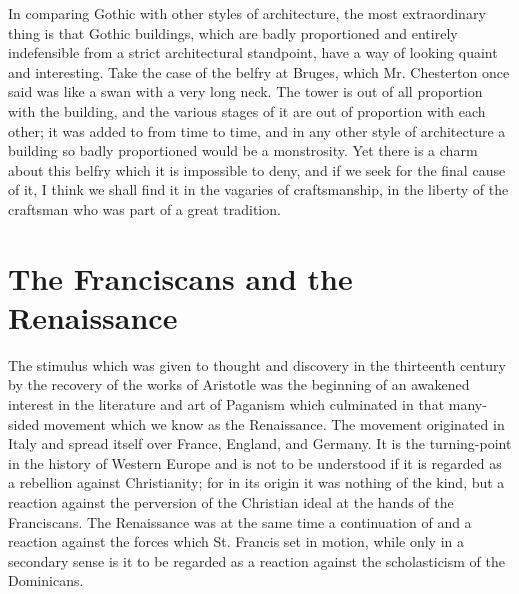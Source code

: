 \documentclass{book}
\begin{document}
In comparing Gothic with other styles of architecture, the most extraordinary thing is that Gothic buildings, which are badly proportioned and entirely indefensible from a strict architectural standpoint, have a way of looking quaint and interesting. Take the case of the belfry at Bruges, which Mr. Chesterton once said was like a swan with a very long neck. The tower is out of all proportion with the building, and the various stages of it are out of proportion with each other; it was added to from time to time, and in any other style of architecture a building so badly proportioned would be a monstrosity. Yet there is a charm about this belfry which it is impossible to deny, and if we seek for the final cause of it, I think we shall find it in the vagaries of craftsmanship, in the liberty of the craftsman who was part of a great tradition.

\chapter{The Franciscans and the Renaissance}
\label{chapter-9}
The stimulus which was given to thought and discovery in the thirteenth century by the recovery of the works of Aristotle was the beginning of an awakened interest in the literature and art of Paganism which culminated in that many-sided movement which we know as the Renaissance. The movement originated in Italy and spread itself over France, England, and Germany. It is the turning-point in the history of Western Europe and is not to be understood if it is regarded as a rebellion against Christianity; for in its origin it was nothing of the kind, but a reaction against the perversion of the Christian ideal at the hands of the Franciscans. The Renaissance was at the same time a continuation of and a reaction against the forces which St. Francis set in motion, while only in a secondary sense is it to be regarded as a reaction against the scholasticism of the Dominicans.
\end{document}
